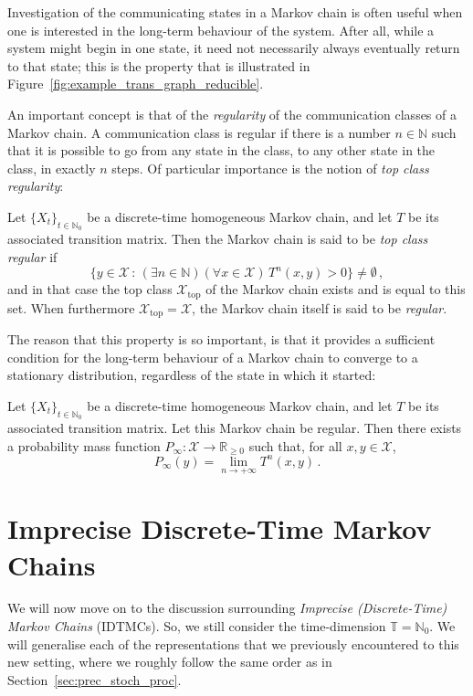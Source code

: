 \documentclass[graybox]{svmult}
\newcommand{\nats}{\mathbb{N}}
\newcommand{\natswith}{\nats_{0}}
\newcommand{\reals}{\mathbb{R}}
\newcommand{\realsnonneg}{\reals_{\geq 0}}
\newcommand{\states}{\mathcal{X}}
\newcommand{\timedim}{\mathbb{T}}
\begin{document}
Investigation of the communicating states in a Markov chain is often useful when one is interested in the long-term behaviour of the system. After all, while a system might begin in one state, it need not necessarily always eventually return to that state; this is the property that is illustrated in Figure~\ref{fig:example_trans_graph_reducible}.

An important concept is that of the \emph{regularity} of the communication classes of a Markov chain. A communication class is regular if there is a number $n\in\nats$ such that it is possible to go from any state in the class, to any other state in the class, in exactly $n$ steps. Of particular importance is the notion of \emph{top class regularity}:
\begin{definition}
Let $\{X_t\}_{t\in\natswith}$ be a discrete-time homogeneous Markov chain, and let $T$ be its associated transition matrix. Then the Markov chain is said to be \emph{top class regular} if
\begin{equation*}
\bigl\{ y\in\states\,:\,(\exists n\in\nats)(\forall x\in\states)\, T^n(x,y)>0 \bigr\} \neq \emptyset\,,
\end{equation*}
and in that case the top class $\states_\mathrm{top}$ of the Markov chain exists and is equal to this set. When furthermore $\states_\mathrm{top}=\states$, the Markov chain itself is said to be \emph{regular}.
\end{definition}
The reason that this property is so important, is that it provides a sufficient condition for the long-term behaviour of a Markov chain to converge to a stationary distribution, regardless of the state in which it started:
\begin{theorem}
Let $\{X_t\}_{t\in\natswith}$ be a discrete-time homogeneous Markov chain, and let $T$ be its associated transition matrix. Let this Markov chain be regular. Then there exists a probability mass function $P_\infty:\states\to\realsnonneg$ such that, for all $x,y\in\states$, 
\begin{equation*}
P_\infty(y) = \lim_{n\to+\infty}T^n(x,y)\,.
\end{equation*}
\end{theorem}

\section{Imprecise Discrete-Time Markov Chains}\label{sec:idtmc}

We will now move on to the discussion surrounding \emph{Imprecise (Discrete-Time) Markov Chains} (IDTMCs). So, we still consider the time-dimension $\timedim=\natswith$. We will generalise each of the representations that we previously encountered to this new setting, where we roughly follow the same order as in Section~\ref{sec:prec_stoch_proc}. 
\end{document}
